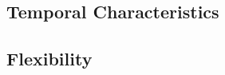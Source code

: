 	\subsection{Temporal Characteristics}
	\label{sec:ExcitationEvaluation-Comparison-TemporalCharacteristics}

	\subsection{Flexibility}
	\label{sec:ExcitationEvaluation-Comparison-Flexibility}

%			
%
%
%
